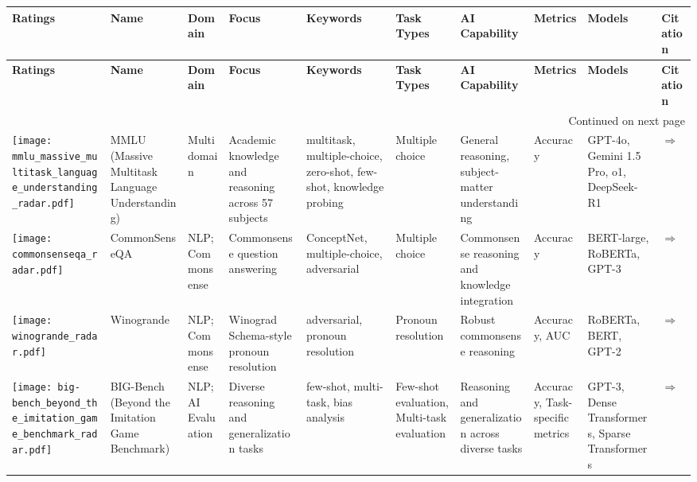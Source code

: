 
\begin{landscape}
{\footnotesize
\begin{longtable}{|p{}|p{}|p{}|p{}|p{}|p{}|p{}|p{}|p{}|p{}|}
\hline
\textbf{Ratings} & \textbf{Name} & \textbf{Domain} & \textbf{Focus} & \textbf{Keywords} & \textbf{Task Types} & \textbf{AI Capability} & \textbf{Metrics} & \textbf{Models} & \textbf{Citation}  \\ \hline
\endfirsthead
\hline
\textbf{Ratings} & \textbf{Name} & \textbf{Domain} & \textbf{Focus} & \textbf{Keywords} & \textbf{Task Types} & \textbf{AI Capability} & \textbf{Metrics} & \textbf{Models} & \textbf{Citation}  \\ \hline
\endhead
\hline
\multicolumn{10}{r}{Continued on next page} \\
\endfoot
\hline
\endlastfoot
\texttt{[image: mmlu\_massive\_multitask\_language\_understanding\_radar.pdf]} & MMLU (Massive Multitask Language Understanding) & Multidomain & Academic knowledge and reasoning across 57 subjects & multitask, multiple-choice, zero-shot, few-shot, knowledge probing & Multiple choice & General reasoning, subject-matter understanding & Accuracy & GPT-4o, Gemini 1.5 Pro, o1, DeepSeek-R1 & \cite{hendrycks2021measuring}\href{https://paperswithcode.com/dataset/mmlu}{$\Rightarrow$} \\ \hline
\texttt{[image: commonsenseqa\_radar.pdf]} & CommonSenseQA & NLP; Commonsense & Commonsense question answering & ConceptNet, multiple-choice, adversarial & Multiple choice & Commonsense reasoning and knowledge integration & Accuracy & BERT-large, RoBERTa, GPT-3 & \cite{talmor2019commonsenseqaquestionansweringchallenge}\href{https://paperswithcode.com/paper/commonsenseqa-a-question-answering-challenge}{$\Rightarrow$} \\ \hline
\texttt{[image: winogrande\_radar.pdf]} & Winogrande & NLP; Commonsense & Winograd Schema-style pronoun resolution & adversarial, pronoun resolution & Pronoun resolution & Robust commonsense reasoning & Accuracy, AUC & RoBERTa, BERT, GPT-2 & \cite{sakaguchi2019winograndeadversarialwinogradschema}\href{https://leaderboard.allenai.org/winogrande/submissions/public}{$\Rightarrow$} \\ \hline
\texttt{[image: big-bench\_beyond\_the\_imitation\_game\_benchmark\_radar.pdf]} & BIG-Bench (Beyond the Imitation Game Benchmark) & NLP; AI Evaluation & Diverse reasoning and generalization tasks & few-shot, multi-task, bias analysis & Few-shot evaluation, Multi-task evaluation & Reasoning and generalization across diverse tasks & Accuracy, Task-specific metrics & GPT-3, Dense Transformers, Sparse Transformers & \cite{srivastava2023imitationgamequantifyingextrapolating}\href{https://github.com/google/BIG-bench}{$\Rightarrow$} \\ \hline

\end{longtable}}
\end{landscape}
